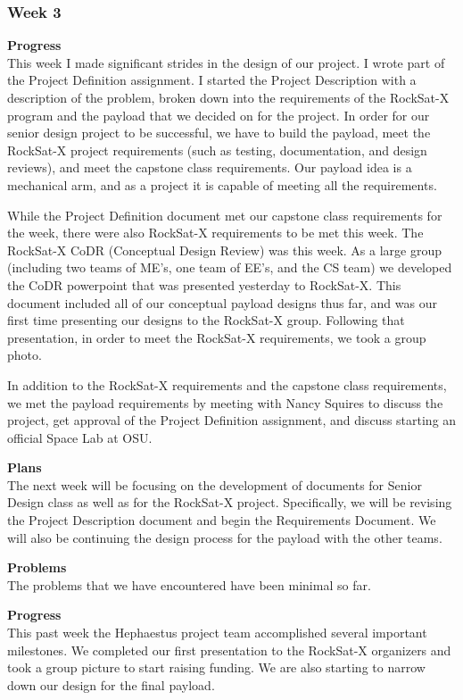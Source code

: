 \subsubsection{Week 3}
\textbf{Progress} \\
This week I made significant strides in the design of our project. I wrote part of the Project Definition assignment. I started the Project Description with a description of the problem, broken down into the requirements of the RockSat-X program and the payload that we decided on for the project. In order for our senior design project to be successful, we have to build the payload, meet the RockSat-X project requirements (such as testing, documentation, and design reviews), and meet the capstone class requirements. Our payload idea is a mechanical arm, and as a project it is capable of meeting all the requirements.

While the Project Definition document met our capstone class requirements for the week, there were also RockSat-X requirements to be met this week. The RockSat-X CoDR (Conceptual Design Review) was this week. As a large group (including two teams of ME's, one team of EE's, and the CS team) we developed the CoDR powerpoint that was presented yesterday to RockSat-X. This document included all of our conceptual payload designs thus far, and was our first time presenting our designs to the RockSat-X group. Following that presentation, in order to meet the RockSat-X requirements, we took a group photo.

In addition to the RockSat-X requirements and the capstone class requirements, we met the payload requirements by meeting with Nancy Squires to discuss the project, get approval of the Project Definition assignment, and discuss starting an official Space Lab at OSU.

\textbf{Plans} \\
The next week will be focusing on the development of documents for Senior Design class as well as for the RockSat-X project. Specifically, we will be revising the Project Description document and begin the Requirements Document. We will also be continuing the design process for the payload with the other teams.

\textbf{Problems} \\
The problems that we have encountered have been minimal so far.

\textbf{Progress} \\
This past week the Hephaestus project team accomplished several important milestones. We completed our first presentation to the RockSat-X organizers and took a group picture to start raising funding. We are also starting to narrow down our design for the final \gls{payload}.

